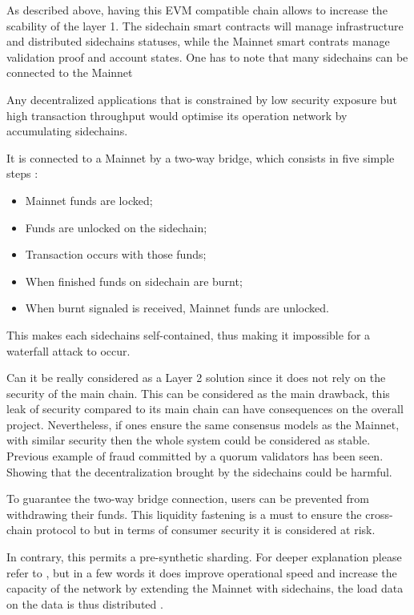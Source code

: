 As described above, having this EVM compatible chain allows to increase the scability of the layer 1. The sidechain smart contracts will manage infrastructure and distributed sidechains statuses, while the Mainnet smart contrats manage validation proof and account states. One has to note that many sidechains can be connected to the Mainnet

Any decentralized applications that is constrained by low security exposure but high transaction throughput would optimise its operation network by accumulating sidechains.

It is connected to a Mainnet by a two-way bridge, which consists in five simple steps :
\begin{itemize}
    \item Mainnet funds are locked;
    \item Funds are unlocked on the sidechain;
    \item Transaction occurs with those funds;
    \item When finished funds on sidechain are burnt;
    \item When burnt signaled is received, Mainnet funds are unlocked.
\end{itemize}
This makes each sidechains self-contained, thus making it impossible for a waterfall attack to occur. 

Can it be really considered as a Layer 2 solution since it does not rely on the security of the main chain. This can be considered as the main drawback, this leak of security compared to its main chain can have consequences on the overall project. Nevertheless, if ones ensure the same consensus models as the Mainnet, with similar security then the whole system could be considered as stable. Previous example of fraud committed by a quorum validators has been seen. Showing that the decentralization brought by the sidechains could be harmful.

To guarantee the two-way bridge connection, users can be prevented from withdrawing their funds. This liquidity fastening is a must to ensure the cross-chain protocol to but in terms of consumer security it is considered at risk.

In contrary, this permits a pre-synthetic sharding. For deeper explanation please refer to \cite{XXX}, but in a few words it does improve operational speed and increase the capacity of the network by extending the Mainnet with sidechains, the load data on the data is thus distributed .

